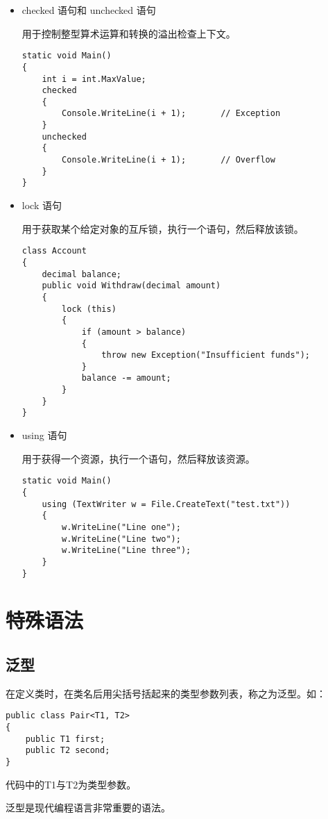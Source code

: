 \begin{itemize}
\item checked 语句和 unchecked 语句

用于控制整型算术运算和转换的溢出检查上下文。

\begin{lstlisting}
static void Main()
{
    int i = int.MaxValue;
    checked 
    {
        Console.WriteLine(i + 1);       // Exception
    }
    unchecked
    {
        Console.WriteLine(i + 1);       // Overflow
    }
}
\end{lstlisting}

\item lock 语句

用于获取某个给定对象的互斥锁，执行一个语句，然后释放该锁。

\begin{lstlisting}
class Account
{
    decimal balance;
    public void Withdraw(decimal amount)
    {
        lock (this)
        {
            if (amount > balance)
            {
                throw new Exception("Insufficient funds");
            }
            balance -= amount;
        }
    }
}
\end{lstlisting}

\item using 语句

用于获得一个资源，执行一个语句，然后释放该资源。

\begin{lstlisting}
static void Main()
{
    using (TextWriter w = File.CreateText("test.txt"))
    {
        w.WriteLine("Line one");
        w.WriteLine("Line two");
        w.WriteLine("Line three");
    }
}
\end{lstlisting}


\end{itemize}


\section{ \cs 特殊语法}

\subsection{泛型}
在定义类时，在类名后用尖括号括起来的类型参数列表，称之为泛型。如：
\begin{lstlisting}
public class Pair<T1, T2>
{
    public T1 first;
    public T2 second;
}
\end{lstlisting}
代码中的T1与T2为类型参数。

泛型是现代编程语言非常重要的语法。

